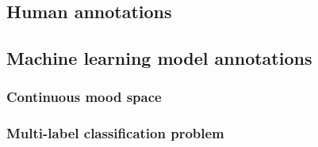 \subsection{Human annotations}

\subsection{Machine learning model annotations}

\subsubsection{Continuous mood space}

\subsubsection{Multi-label classification problem}